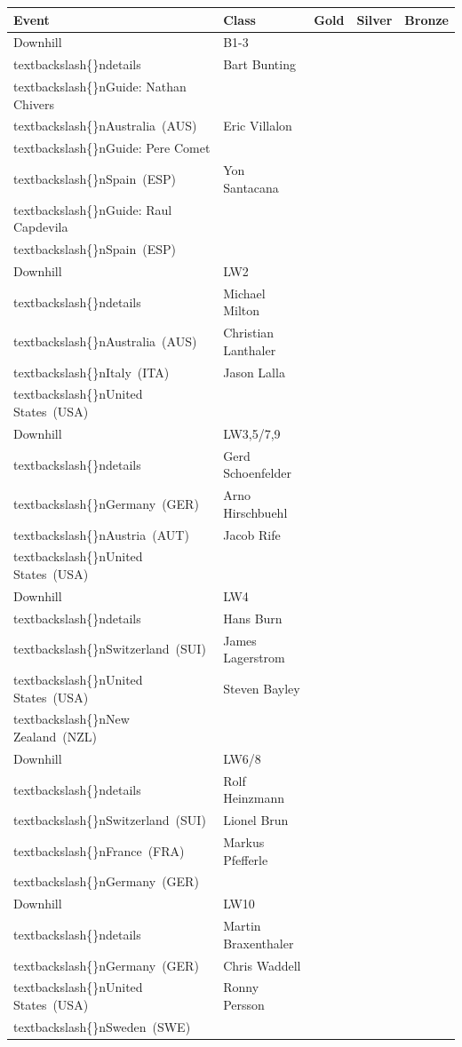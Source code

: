 \documentclass{article}
\begin{document}
\begin{tabular}{lllll}
\toprule
Event & Class & Gold & Silver & Bronze \\
\midrule
Downhill & B1-3\\textbackslash\{\}ndetails & Bart Bunting\\textbackslash\{\}nGuide: Nathan Chivers\\textbackslash\{\}nAustralia (AUS) & Eric Villalon\\textbackslash\{\}nGuide: Pere Comet\\textbackslash\{\}nSpain (ESP) & Yon Santacana\\textbackslash\{\}nGuide: Raul Capdevila\\textbackslash\{\}nSpain (ESP) \\
Downhill & LW2\\textbackslash\{\}ndetails & Michael Milton\\textbackslash\{\}nAustralia (AUS) & Christian Lanthaler\\textbackslash\{\}nItaly (ITA) & Jason Lalla\\textbackslash\{\}nUnited States (USA) \\
Downhill & LW3,5/7,9\\textbackslash\{\}ndetails & Gerd Schoenfelder\\textbackslash\{\}nGermany (GER) & Arno Hirschbuehl\\textbackslash\{\}nAustria (AUT) & Jacob Rife\\textbackslash\{\}nUnited States (USA) \\
Downhill & LW4\\textbackslash\{\}ndetails & Hans Burn\\textbackslash\{\}nSwitzerland (SUI) & James Lagerstrom\\textbackslash\{\}nUnited States (USA) & Steven Bayley\\textbackslash\{\}nNew Zealand (NZL) \\
Downhill & LW6/8\\textbackslash\{\}ndetails & Rolf Heinzmann\\textbackslash\{\}nSwitzerland (SUI) & Lionel Brun\\textbackslash\{\}nFrance (FRA) & Markus Pfefferle\\textbackslash\{\}nGermany (GER) \\
Downhill & LW10\\textbackslash\{\}ndetails & Martin Braxenthaler\\textbackslash\{\}nGermany (GER) & Chris Waddell\\textbackslash\{\}nUnited States (USA) & Ronny Persson\\textbackslash\{\}nSweden (SWE) \\

\end{tabular}
\end{document}
